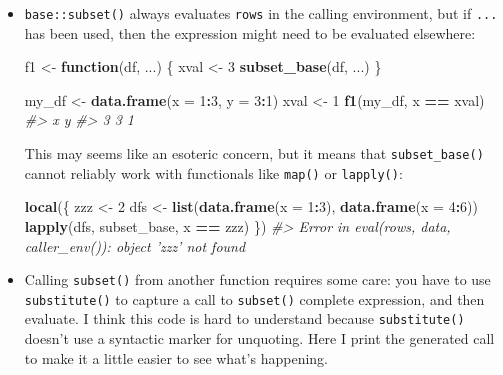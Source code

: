 \documentclass[]{book}
\newenvironment{Shaded}{\begin{snugshade}}{\end{snugshade}}
\newcommand{\CommentTok}[1]{\textcolor[rgb]{0.37,0.37,0.37}{\textit{#1}}}
\newcommand{\ControlFlowTok}[1]{\textcolor[rgb]{0.27,0.27,0.27}{\textbf{#1}}}
\newcommand{\DataTypeTok}[1]{\textcolor[rgb]{0.27,0.27,0.27}{#1}}
\newcommand{\DecValTok}[1]{\textcolor[rgb]{0.06,0.06,0.06}{#1}}
\newcommand{\KeywordTok}[1]{\textcolor[rgb]{0.27,0.27,0.27}{\textbf{#1}}}
\newcommand{\NormalTok}[1]{#1}
\newcommand{\OperatorTok}[1]{\textcolor[rgb]{0.43,0.43,0.43}{\textbf{#1}}}
\newcommand{\StringTok}[1]{\textcolor[rgb]{0.5,0.5,0.5}{#1}}
\begin{document}
\begin{itemize}
\item
  \texttt{base::subset()} always evaluates \texttt{rows} in the calling environment, but
  if \texttt{...} has been used, then the expression might need to be evaluated
  elsewhere:

\begin{Shaded}
\begin{Highlighting}[]
\NormalTok{f1 <-}\StringTok{ }\ControlFlowTok{function}\NormalTok{(df, ...) \{}
\NormalTok{  xval <-}\StringTok{ }\DecValTok{3}
  \KeywordTok{subset_base}\NormalTok{(df, ...)}
\NormalTok{\}}

\NormalTok{my_df <-}\StringTok{ }\KeywordTok{data.frame}\NormalTok{(}\DataTypeTok{x =} \DecValTok{1}\OperatorTok{:}\DecValTok{3}\NormalTok{, }\DataTypeTok{y =} \DecValTok{3}\OperatorTok{:}\DecValTok{1}\NormalTok{)}
\NormalTok{xval <-}\StringTok{ }\DecValTok{1}
\KeywordTok{f1}\NormalTok{(my_df, x }\OperatorTok{==}\StringTok{ }\NormalTok{xval)}
\CommentTok{#>   x y}
\CommentTok{#> 3 3 1}
\end{Highlighting}
\end{Shaded}

  This may seems like an esoteric concern, but it means that \texttt{subset\_base()}
  cannot reliably work with functionals like \texttt{map()} or \texttt{lapply()}:

\begin{Shaded}
\begin{Highlighting}[]
\KeywordTok{local}\NormalTok{(\{}
\NormalTok{  zzz <-}\StringTok{ }\DecValTok{2}
\NormalTok{  dfs <-}\StringTok{ }\KeywordTok{list}\NormalTok{(}\KeywordTok{data.frame}\NormalTok{(}\DataTypeTok{x =} \DecValTok{1}\OperatorTok{:}\DecValTok{3}\NormalTok{), }\KeywordTok{data.frame}\NormalTok{(}\DataTypeTok{x =} \DecValTok{4}\OperatorTok{:}\DecValTok{6}\NormalTok{))}
  \KeywordTok{lapply}\NormalTok{(dfs, subset_base, x }\OperatorTok{==}\StringTok{ }\NormalTok{zzz)}
\NormalTok{\})}
\CommentTok{#> Error in eval(rows, data, caller_env()): object 'zzz' not found}
\end{Highlighting}
\end{Shaded}
\item
  Calling \texttt{subset()} from another function requires some care: you have
  to use \texttt{substitute()} to capture a call to \texttt{subset()} complete expression,
  and then evaluate. I think this code is hard to understand because
  \texttt{substitute()} doesn't use a syntactic marker for unquoting. Here I print
  the generated call to make it a little easier to see what's happening.


\end{itemize}
\end{document}

